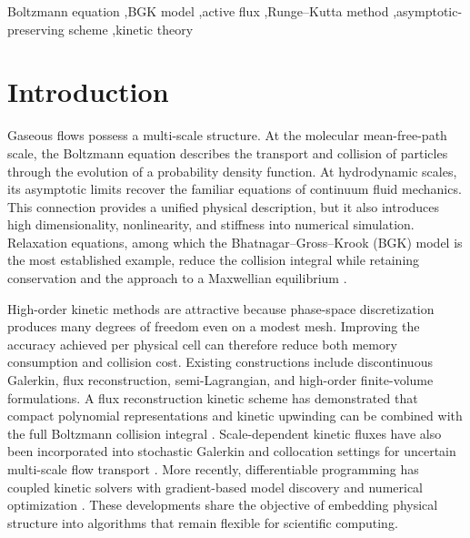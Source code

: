 \documentclass[preprint,3p,12pt]{elsarticle}
\begin{document}
\begin{frontmatter}
\begin{abstract}
increases. A preliminary normal-shock calculation compares full Boltzmann and BGK collisions and shows that heat flux distinguishes them earlier than the conserved macroscopic profiles. Steady shock refinement, the cavity, and uniform-in-Knudsen asymptotic validation remain to be completed.
\end{abstract}

\begin{keyword}
Boltzmann equation \sep BGK model \sep active flux \sep Runge--Kutta method \sep asymptotic-preserving scheme \sep kinetic theory
\end{keyword}

\end{frontmatter}

\section{Introduction}
\label{sec:introduction}

Gaseous flows possess a multi-scale structure. At the molecular mean-free-path scale, the Boltzmann equation describes the transport and collision of particles through the evolution of a probability density function. At hydrodynamic scales, its asymptotic limits recover the familiar equations of continuum fluid mechanics. This connection provides a unified physical description, but it also introduces high dimensionality, nonlinearity, and stiffness into numerical simulation. Relaxation equations, among which the Bhatnagar--Gross--Krook (BGK) model is the most established example, reduce the collision integral while retaining conservation and the approach to a Maxwellian equilibrium \cite{bhatnagar1954model,cercignani1988boltzmann}.

High-order kinetic methods are attractive because phase-space discretization produces many degrees of freedom even on a modest mesh. Improving the accuracy achieved per physical cell can therefore reduce both memory consumption and collision cost. Existing constructions include discontinuous Galerkin, flux reconstruction, semi-Lagrangian, and high-order finite-volume formulations. A flux reconstruction kinetic scheme has demonstrated that compact polynomial representations and kinetic upwinding can be combined with the full Boltzmann collision integral \cite{xiao2021flux}. Scale-dependent kinetic fluxes have also been incorporated into stochastic Galerkin and collocation settings for uncertain multi-scale flow transport \cite{xiao2021stochastic}. More recently, differentiable programming has coupled kinetic solvers with gradient-based model discovery and numerical optimization \cite{xiao2025differentiable}. These developments share the objective of embedding physical structure into algorithms that remain flexible for scientific computing.
\end{document}

